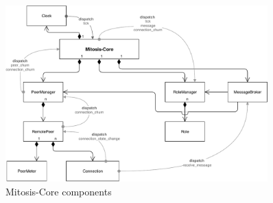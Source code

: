 \begin{figure}
\centering
\vspace{15cm}
\includegraphics[width=0.9\textwidth]{graphics/implementation/mitosis-architecture.pdf}
\caption{Mitosis-Core components}
\label{fig:mit-core-architecture}
\end{figure}
